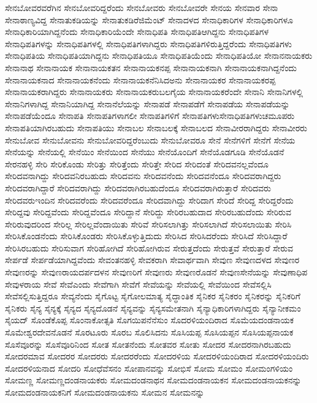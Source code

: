 {ಸೇನಬೋವರವರೆಗಿನ
ಸೇನಬೋವರಿದ್ದರೆಂದು
ಸೇನಬೋವರು
ಸೇನಬೋವರೇ
ಸೇನಯ
ಸೇನವಾರ
ಸೇನಾ
ಸೇನಾಠಾಣ್ಯವಿದ್ದ
ಸೇನಾತುಕಡಿಯನ್ನು
ಸೇನಾತುಕಡಿರೆಜಿಮೆಂಟ್
ಸೇನಾದಳದ
ಸೇನಾಧಿಕಾರಿಗಳ
ಸೇನಾಧಿಕಾರಿಗಳೂ
ಸೇನಾಧಿಕಾರಿಯಾಗಿದ್ದನೆಂದು
ಸೇನಾಧಿಕಾರಿಯೆಂದೇ
ಸೇನಾಧಿಪತಿ
ಸೇನಾಧಿಪತಿಆಗಿದ್ದನು
ಸೇನಾಧಿಪತಿಗಳ
ಸೇನಾಧಿಪತಿಗಳನ್ನು
ಸೇನಾಧಿಪತಿಗಳಲ್ಲಿ
ಸೇನಾಧಿಪತಿಗಳಾಗಿದ್ದರು
ಸೇನಾಧಿಪತಿಗಳಿರುತ್ತಿದ್ದರೆಂದು
ಸೇನಾಧಿಪತಿಗಳು
ಸೇನಾಧಿಪತಿಯ
ಸೇನಾಧಿಪತಿಯಾಗಿದ್ದನು
ಸೇನಾಧಿಪತಿಯೂ
ಸೇನಾಧಿಪತಿಯೆಂದು
ಸೇನಾಧಿಪತಿಯೋ
ಸೇನಾನನಾಯಕರು
ಸೇನಾನಾಥ
ಸೇನಾನಾಯಕ
ಸೇನಾನಾಯಕತನ
ಸೇನಾನಾಯಕನಪ್ಪ
ಸೇನಾನಾಯಕನಾಗಿ
ಸೇನಾನಾಯಕನಾಗಿದ್ದನೆಂದು
ಸೇನಾನಾಯಕನಾದ
ಸೇನಾನಾಯಕನೆಂದು
ಸೇನಾನಾಯಕನೆನಿಸಿದಅನು
ಸೇನಾನಾಯಕರ
ಸೇನಾನಾಯಕರಪ್ಪ
ಸೇನಾನಾಯಕರಾಗಿದ್ದರು
ಸೇನಾನಾಯಕರು
ಸೇನಾನಾಯಕರುಬಲಗೈಯ
ಸೇನಾನಾಯಕರೆಂದೇ
ಸೇನಾನಿ
ಸೇನಾನಿಗಳಲ್ಲಿ
ಸೇನಾನಿಗಳಾಗಿದ್ದ
ಸೇನಾನಿಯಾಗಿದ್ದ
ಸೇನಾನೆಲೆಯನ್ನು
ಸೇನಾಪಡೆ
ಸೇನಾಪಡೆಗೆ
ಸೇನಾಪಡೆಯ
ಸೇನಾಪಡೆಯನ್ನು
ಸೇನಾಪಡೆಯೆಂದೂ
ಸೇನಾಪತಿ
ಸೇನಾಪತಿಗಳಾಗಲೀ
ಸೇನಾಪತಿಗಳಿಗೆ
ಸೇನಾಪತಿಗಳುಸೇನಾಧಿಪತಿಗಳುಚಮೂಪರು
ಸೇನಾಪತಿಯಾಗಿರಬಹುದು
ಸೇನಾಪತಿಯು
ಸೇನಾಬಲ
ಸೇನಾಬಲಕ್ಕೆ
ಸೇನಾಬಲದ
ಸೇನಾವೀರರಾಗಿದ್ದರು
ಸೇನಾವೀರರು
ಸೇನುಬೋವ
ಸೇನುಬೋವನು
ಸೇನುಬೋವರಿದ್ದರೆಂಬುದು
ಸೇನುಬೋವರೂ
ಸೇನೆ
ಸೇನೆಗಳಿಗೆ
ಸೇನೆಗೆ
ಸೇನೆಯ
ಸೇನೆಯನ್ನು
ಸೇನೆಯಲ್ಲಿ
ಸೇನೆಯಿಂ
ಸೇನೆಯಿಂದ
ಸೇನೆಯು
ಸೇನೆಯೊಂದಿಗೆ
ಸೇನೆಯೊಡಗೂಡಿ
ಸೇನೆಯೊಡನೆ
ಸೇರನಹಳ್ಳಿ
ಸೇರಿ
ಸೇರಿಕೊಂಡು
ಸೇರಿತ್ತು
ಸೇರಿತ್ತೆಂದು
ಸೇರಿತ್ತೇ
ಸೇರಿದ
ಸೇರಿದಂತೆ
ಸೇರಿದವನಲ್ಲವೆಂದೂ
ಸೇರಿದವನಾಗಿದ್ದು
ಸೇರಿದವನಿರಬಹುದು
ಸೇರಿದವನು
ಸೇರಿದವನೆಂದು
ಸೇರಿದವನೆಂದೂ
ಸೇರಿದವರಾಗಿದ್ದರು
ಸೇರಿದವರಾಗಿದ್ದಾರೆ
ಸೇರಿದವರಾಗಿದ್ದು
ಸೇರಿದವರಾಗಿರಬಹುದೆಂದೂ
ಸೇರಿದವರಾಗಿರುತ್ತಾರೆ
ಸೇರಿದವರು
ಸೇರಿದವರುಇಂದಿನ
ಸೇರಿದವರೆಂದು
ಸೇರಿದವರೆಂದೂ
ಸೇರಿದವಾಗಿದ್ದು
ಸೇರಿದಾಗ
ಸೇರಿದೆ
ಸೇರಿದ್ದ
ಸೇರಿದ್ದರೆಂದು
ಸೇರಿದ್ದವು
ಸೇರಿದ್ದವೆಂದು
ಸೇರಿದ್ದವೆಂದೂ
ಸೇರಿದ್ದಾನೆ
ಸೇರಿದ್ದು
ಸೇರಿರಬಹುದಾದ
ಸೇರಿರಬಹುದೆಂದು
ಸೇರಿರುವ
ಸೇರಿರುವುದರಿಂದ
ಸೇರಿಲ್ಲ
ಸೇರಿಲ್ಲವೆಂದಾಯಿತು
ಸೇರಿವೆ
ಸೇರಿಸಲಾಗಿತ್ತು
ಸೇರಿಸಲಾಗಿದೆ
ಸೇರಿಸಲಾಯಿತು
ಸೇರಿಸಿ
ಸೇರಿಸಿಕೊಂಡನೆಂದು
ಸೇರಿಸಿಕೊಂಡರು
ಸೇರಿಸಿಕೊಳ್ಳುತ್ತಿದುದು
ಸೇರಿಸಿದ
ಸೇರಿಸಿದರೆಂದು
ಸೇರಿಸಿದೆ
ಸೇರಿಸಿದ್ದಾರೆ
ಸೇರಿಸಿರಬಹುದು
ಸೇರಿಸುವಾಗ
ಸೇರಿಹೋಗಿದೆ
ಸೇರಿಹೋಗಿರುವ
ಸೇರುತ್ತದೆಂದು
ಸೇರುತ್ತವೆ
ಸೇರುತ್ತಾರೆ
ಸೇರುವ
ಸೇರ್ಪಡೆ
ಸೇರ್ಪಡೆಯಾಗಿದ್ದವೆಂದು
ಸೇವಂತನಹಳ್ಳಿ
ಸೇವಕರಾಗಿ
ಸೇವಾರ್ಥವಾಗಿ
ಸೇವುಣ
ಸೇವುಣದಳದ
ಸೇವುಣರ
ಸೇವುಣರನ್ನು
ಸೇವುಣರಾಯದರ್ಪದಳನ
ಸೇವುಣರಿಗೆ
ಸೇವುಣರು
ಸೇವುಣರೊಡನೆ
ಸೇವುಣಸೇನೆಯನ್ನು
ಸೇವುಣಾಧಿಪ
ಸೇವುಳರಾಯ
ಸೇವೆ
ಸೇವೆಎಂದು
ಸೇವೆಗಾಗಿ
ಸೇವೆಗೆ
ಸೇವೆಯನ್ನು
ಸೇವೆಯಲ್ಲಿ
ಸೇವೆಯಿಂದ
ಸೇವೆಸಲ್ಲಿಸಿ
ಸೇವೆಸಲ್ಲಿಸುತ್ತಿದ್ದರೂ
ಸೇವ್ಯನೆಂದು
ಸೈಗೊಟ್ಟ
ಸೈಗೋಲಮಾತ್ಯ
ಸೈದ್ಧಾಂತಿಕ
ಸೈನಿಕರ
ಸೈನಿಕರಂ
ಸೈನಿಕರನ್ನು
ಸೈನಿಕರಿಗೆ
ಸೈನಿಕರು
ಸೈನ್ಯ
ಸೈನ್ಯಕ್ಕೆ
ಸೈನ್ಯದ
ಸೈನ್ಯದೊಡನೆ
ಸೈನ್ಯವನ್ನು
ಸೈನ್ಯಸಮೇತನಾಗಿ
ಸೈನ್ಯಾಧಿಕಾರಿಗಳಾಗಿದ್ದರು
ಸೈನ್ಯಾನೀಕಮಂ
ಸೈಯದ್
ಸೊಂಡೆಕೊಪ್ಪ
ಸೊಂನಾಕೋತ್ಸತಿ
ಸೊಗಯಿಪನೆನೆಸುಂ
ಸೊದರಳಿಯಂದಿರಾದ
ಸೊಮೆಯದಂಡನಾಯಕ
ಸೊಮೇಶ್ವರದೇವನೊಡನೆ
ಸೊರಟೂರು
ಸೊರಬ
ಸೊಲಿಸಿದನು
ಸೊಸಿಯಪ್ಪ
ಸೊಸಿಯಪ್ಪನ
ಸೊಸಿಯಪ್ಪನಾಯಕ
ಸೊಸೆವೂರನ್ನು
ಸೊಸೆವೂರಿನಿಂದ
ಸೋತ
ಸೋತನೆಂದು
ಸೋತವರ
ಸೋತು
ಸೋದರ
ಸೋದರನಾಗಿರಬಹುದು
ಸೋದರಮಾವ
ಸೋದರರ
ಸೋದರರು
ಸೋದರರೆಂದು
ಸೋದರಳಿಯ
ಸೋದರಳಿಯಂದಿರಾದ
ಸೋದರಳಿಯಂದಿರು
ಸೋದರಳಿಯನಾದ
ಸೋದರಿ
ಸೋಧೆವೆಸನಂ
ಸೋಪಾನವನ್ನು
ಸೋಭಿಸೆ
ಸೋಮ
ಸೋಮಂ
ಸೋಮಂಗಳಿಯಂ
ಸೋಮಣ್ಣ
ಸೋಮಣ್ಣದಂಡನಾಯಕರು
ಸೋಮದಂಡನಾಥನ
ಸೋಮದಂಡನಾಯಕನ
ಸೋಮದಂಡನಾಯಕನನ್ನು
ಸೋಮದಂಡನಾಯಕನಿಗೆ
ಸೋಮದಂಡನಾಯಕನು
ಸೋಮನ
ಸೋಮನನ್ನು
}
